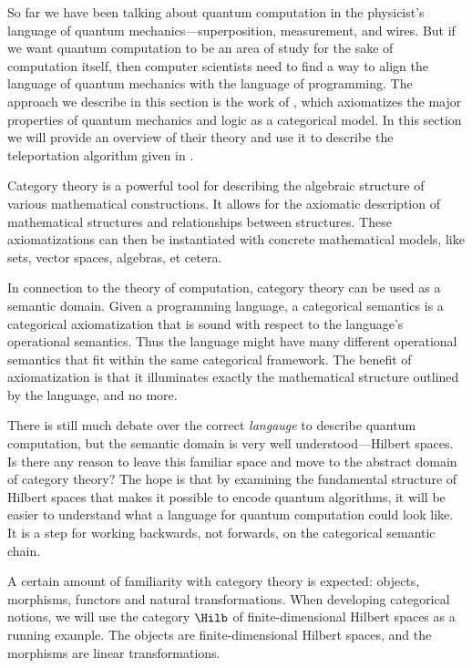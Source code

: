 So far we have been talking about quantum computation in the physicist's language
of quantum mechanics---superposition, measurement, and wires. 
But if we want quantum computation to be an area of study for the sake of
computation itself, then computer scientists need to find a way to align
the language of quantum mechanics with the language of programming.
The approach we describe in this section is the work of \cite{abramsky2009categorical},
which axiomatizes the major properties of quantum mechanics and logic as a categorical model.
In this section we will provide an overview of their theory and use it to describe the
teleportation algorithm given in .

Category theory is a powerful tool for describing the algebraic structure of
various mathematical constructions. It allows for the axiomatic description
of mathematical structures and relationships between structures. These axiomatizations
can then be instantiated with concrete mathematical models, like sets,
vector spaces, algebras, et cetera. 

In connection to the theory of computation, category theory can be used as a semantic
domain. Given a programming language, a categorical semantics is a categorical axiomatization
that is sound with respect to the language's operational semantics. 
Thus the language might have many different operational semantics that fit within the same
categorical framework. 
The benefit of axiomatization is that it illuminates exactly the mathematical structure
outlined by the language, and no more.

There is still much debate over the correct \emph{langauge} to describe quantum computation,
but the semantic domain is very well understood---Hilbert spaces.
Is there any reason to leave this familiar space and move to the abstract domain of category theory?
The hope is that by examining the fundamental structure of Hilbert spaces that makes it possible
to encode quantum algorithms, it will be easier to understand what a language for
quantum computation could look like. It is a step for working backwards, not forwards,
on the categorical semantic chain.


A certain amount of familiarity with category theory is expected: objects, morphisms,
functors and natural transformations.
When developing categorical notions, we will use the category $\Hilb$ of finite-dimensional
Hilbert spaces as a running example. The objects are finite-dimensional Hilbert spaces,
and the morphisms are linear transformations. 

